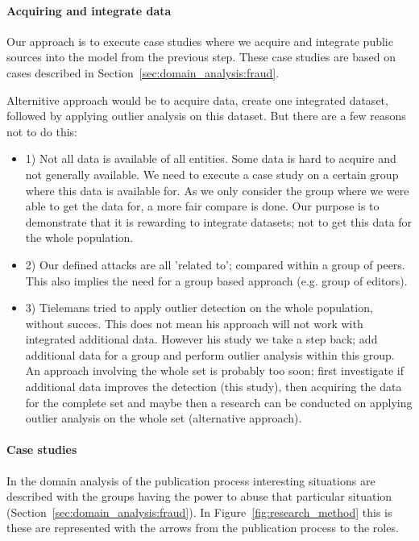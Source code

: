 \documentclass{ou-report}
\begin{document}
\paragraph{Acquiring and integrate data}
Our approach is to execute case studies where we acquire and integrate 
public sources into the model from the previous step. These case studies are 
based on cases described in Section~\ref{sec:domain_analysis:fraud}.

Alternitive approach would be to acquire data, create one integrated dataset, 
followed by applying outlier analysis on this dataset. 
But there are a few reasons not to do this:
\begin{itemize}
    \item 1) Not all data is available of all entities. Some data is hard to 
    acquire and not generally available. We need to
    execute a case study on a certain group where this data is available for.
    As we only consider the group where we were able to get the data for, a 
    more fair compare is done. Our purpose is to demonstrate that it is 
    rewarding to integrate datasets; not to get this data for the whole population.
    \item 2) Our defined attacks are all 'related to'; compared within a group of
    peers. This also implies the need for a group based approach (e.g. group 
    of editors).
    \item 3) Tielemans tried to apply outlier detection on the whole population, 
    without succes. This does not mean his approach will not work with integrated 
    additional data. However his study we take a step back; add additional data 
    for a group and perform outlier analysis within this group. An approach 
    involving the whole set is probably too soon; first investigate if additional 
    data improves the detection (this study), then acquiring the data for the 
    complete set and maybe then a research can be conducted on applying outlier 
    analysis on the whole set (alternative approach).
\end{itemize}

\paragraph{Case studies}
In the domain analysis of the publication process interesting situations are 
described with the groups having the power to abuse that particular situation
(Section~\ref{sec:domain_analysis:fraud}). In Figure~\ref{fig:research_method} this
is these are represented with the arrows from the publication process to the roles.
\end{document}
